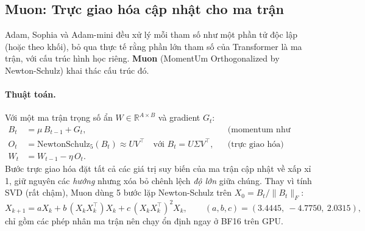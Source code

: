 \subsection{Muon: Trực giao hóa cập nhật cho ma trận}
\label{ssec:muon}
Adam, Sophia và Adam-mini đều xử lý mỗi tham số như một phần tử độc lập (hoặc theo khối), bỏ qua thực tế rằng phần lớn tham số của Transformer là ma trận, với cấu trúc hình học riêng. \textbf{Muon} (MomentUm Orthogonalized by Newton-Schulz) \cite{jordan2024muon} khai thác cấu trúc đó.

\paragraph{Thuật toán.} Với một ma trận trọng số ẩn $W \in \mathbb{R}^{A\times B}$ và gradient $G_t$:
\begin{align}
	B_t &= \mu\, B_{t-1} + G_t, && \text{(momentum như SGD)}\\
	O_t &= \text{NewtonSchulz}_5(B_t) \approx U V^\top \quad \text{với } B_t = U\Sigma V^\top, && \text{(trực giao hóa)}\\
	W_t &= W_{t-1} - \eta\, O_t.
\end{align}
Bước trực giao hóa đặt tất cả các giá trị suy biến của ma trận cập nhật về xấp xỉ 1, giữ nguyên các \emph{hướng} nhưng xóa bỏ chênh lệch \emph{độ lớn} giữa chúng. Thay vì tính SVD (rất chậm), Muon dùng 5 bước lặp Newton-Schulz trên $X_0 = B_t/\|B_t\|_F$:
\[
X_{k+1} = a X_k + b\,(X_k X_k^\top) X_k + c\,(X_k X_k^\top)^2 X_k, \qquad (a, b, c) = (3.4445,\ -4.7750,\ 2.0315),
\]
chỉ gồm các phép nhân ma trận nên chạy ổn định ngay ở BF16 trên GPU.

\begin{center}
\label{fig:muon_newton_schulz}
\end{center}



